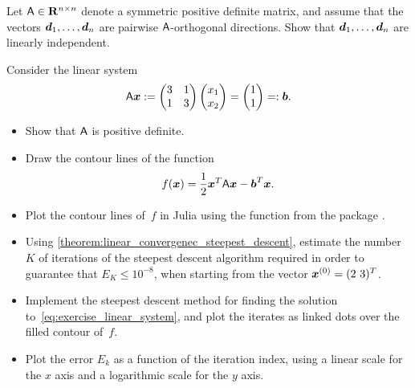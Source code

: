\begin{exercise}
    \label{exercise:linear_independence_conjugate_directions}
    Let $\mathsf A \in \mathbf R^{n \times n}$ denote a symmetric positive definite matrix,
    and assume that the vectors $\mathbf{\boldsymbol{d}}_1, \dotsc, \mathbf{\boldsymbol{d}}_n$ are pairwise $\mathsf A$-orthogonal directions.
    Show that $\mathbf{\boldsymbol{d}}_1, \dotsc, \mathbf{\boldsymbol{d}}_n$ are linearly independent.
\end{exercise}

\begin{compexercise}
    Consider the linear system
    \begin{equation}
        \label{eq:exercise_linear_system}
        \mathsf A \mathbf{\boldsymbol{x}} :=
        \begin{pmatrix}
            3 & 1 \\ 1 & 3
        \end{pmatrix}
        \begin{pmatrix}
            x_1 \\
            x_2
        \end{pmatrix}
        =
        \begin{pmatrix}
            1 \\
            1
        \end{pmatrix} =: \mathbf{\boldsymbol{b}}.
    \end{equation}
    \begin{itemize}
        \item
            Show that $\mathsf A$ is positive definite.

        \item
            Draw the contour lines of the function
            \[
                f(\mathbf{\boldsymbol{x}}) = \frac{1}{2} \mathbf{\boldsymbol{x}}^T \mathsf A \mathbf{\boldsymbol{x}} - \mathbf{\boldsymbol{b}}^T \mathbf{\boldsymbol{x}}.
            \]

        \item
            Plot the contour lines of~$f$ in Julia using the function  from the package .

        \item
            Using \cref{theorem:linear_convergenec_steepest_descent},
            estimate the number~$K$ of iterations of the steepest descent algorithm required in order to guarantee that $E_K \leq 10^{-8}$,
            when starting from the vector $\mathbf{\boldsymbol{x}}^{(0)} = (2~3)^T$.

        \item
            Implement the steepest descent method for finding the solution to~\eqref{eq:exercise_linear_system},
            and plot the iterates as linked dots over the filled contour of~$f$.

        \item
            Plot the error $E_k$ as a function of the iteration index,
            using a linear scale for the $x$ axis and a logarithmic scale for the $y$ axis.
    \end{itemize}
\end{compexercise}

